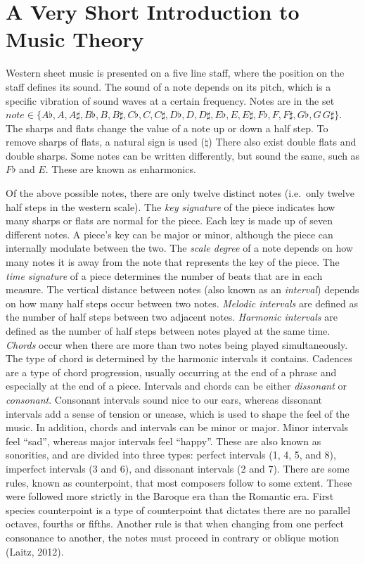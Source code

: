 \documentclass[12pt,twoside]{reedthesis}
\theoremstyle{definition}
\theoremstyle{definition}
\theoremstyle{definition}
\theoremstyle{remark}
\begin{document}
\section{A Very Short Introduction to Music
Theory}\label{a-very-short-introduction-to-music-theory}

Western sheet music is presented on a five line staff, where the
position on the staff defines its sound. The sound of a note depends on
its pitch, which is a specific vibration of sound waves at a certain
frequency. Notes are in the set
\(note \in \{A\flat,A,A\sharp,B\flat,B,B\sharp,C\flat,C,C\sharp,D\flat,D,D\sharp,E\flat,E,E\sharp,F\flat,F,F\sharp,G\flat,G\,G\sharp\}\).
The sharps and flats change the value of a note up or down a half step.
To remove sharps of flats, a natural sign is used (\(\natural\)) There
also exist double flats and double sharps. Some notes can be written
differently, but sound the same, such as \(F\flat\) and \(E\). These are
known as enharmonics.

Of the above possible notes, there are only twelve distinct notes
(i.e.~only twelve half steps in the western scale). The \emph{key
signature} of the piece indicates how many sharps or flats are normal
for the piece. Each key is made up of seven different notes. A piece's
key can be major or minor, although the piece can internally modulate
between the two. The \emph{scale degree} of a note depends on how many
notes it is away from the note that represents the key of the piece. The
\emph{time signature} of a piece determines the number of beats that are
in each measure. The vertical distance between notes (also known as an
\emph{interval}) depends on how many half steps occur between two notes.
\emph{Melodic intervals} are defined as the number of half steps between
two adjacent notes. \emph{Harmonic intervals} are defined as the number
of half steps between notes played at the same time. \emph{Chords} occur
when there are more than two notes being played simultaneously. The type
of chord is determined by the harmonic intervals it contains. Cadences
are a type of chord progression, usually occurring at the end of a
phrase and especially at the end of a piece. Intervals and chords can be
either \emph{dissonant} or \emph{consonant}. Consonant intervals sound
nice to our ears, whereas dissonant intervals add a sense of tension or
unease, which is used to shape the feel of the music. In addition,
chords and intervals can be minor or major. Minor intervals feel
``sad'', whereas major intervals feel ``happy''. These are also known as
sonorities, and are divided into three types: perfect intervals (1, 4,
5, and 8), imperfect intervals (3 and 6), and dissonant intervals (2 and
7). There are some rules, known as counterpoint, that most composers
follow to some extent. These were followed more strictly in the Baroque
era than the Romantic era. First species counterpoint is a type of
counterpoint that dictates there are no parallel octaves, fourths or
fifths. Another rule is that when changing from one perfect consonance
to another, the notes must proceed in contrary or oblique motion (Laitz,
2012).
\end{document}
